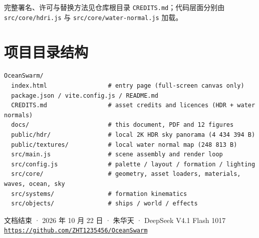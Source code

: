 \documentclass[UTF8, a4paper, 11pt]{ctexart}
\newcommand{\file}[1]{\texttt{#1}}
\newcommand{\repolink}{\href{https://github.com/ZHT1235456/OceanSwarm}{\texttt{https://github.com/ZHT1235456/OceanSwarm}}}
\begin{document}
完整署名、许可与替换方法见仓库根目录 \file{CREDITS.md}；代码层面分别由 \file{src/core/hdri.js} 与 \file{src/core/water-normal.js} 加载。

\section{项目目录结构}

\begin{lstlisting}[caption={项目目录结构}, label={lst:tree}]
OceanSwarm/
  index.html                 # entry page (full-screen canvas only)
  package.json / vite.config.js / README.md
  CREDITS.md                 # asset credits and licences (HDR + water normals)
  docs/                      # this document, PDF and 12 figures
  public/hdr/                # local 2K HDR sky panorama (4 434 394 B)
  public/textures/           # local water normal map (248 813 B)
  src/main.js                # scene assembly and render loop
  src/config.js              # palette / layout / formation / lighting
  src/core/                  # geometry, asset loaders, materials, waves, ocean, sky
  src/systems/               # formation kinematics
  src/objects/               # ships / world / effects
\end{lstlisting}

\vfill
\begin{center}
{\small\color{themegray}
文档结束 · 2026 年 10 月 22 日 · 朱华天 · DeepSeek V4.1 Flash 1017\\[0.3em]
\repolink}
\end{center}
\end{document}

